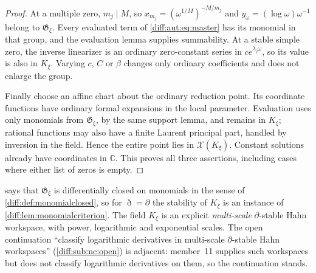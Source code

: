 \documentclass[11pt,letterpaper]{article}
\numberwithin{equation}{section}
\theoremstyle{definition}
\theoremstyle{remark}
\newcommand{\C}{\mathbb C}
\newcommand{\der}{\partial}
\newcommand{\Dn}{\eth}
\begin{document}
\begin{proof}
At a multiple zero, $m_j\mid M$, so
$x_{m_j}=(\omega^{1/M})^{-M/m_j}$ and
$y_\omega=(\log\omega)\omega^{-1}$ belong to $\mathfrak G_\xi$.
Every evaluated term of \cref{diff:aut:eq:master} has its monomial
in that group, and the evaluation lemma supplies summability.
At a stable simple zero, the inverse linearizer is an ordinary
zero-constant series in $c e^{\lambda_j\omega}$, so its value is also
in $K_\xi$. Varying $c$, $C$ or $\beta$ changes only ordinary
coefficients and does not enlarge the group.

Finally choose an affine chart about the ordinary reduction point.
Its coordinate functions have ordinary formal expansions in the local
parameter. Evaluation uses only monomials from $\mathfrak G_\xi$,
by the same support lemma, and remains in $K_\xi$; rational functions
may also have a finite Laurent principal part, handled by inversion
in the field. Hence the entire point lies in $\mathcal X(K_\xi)$.
Constant solutions already have coordinates in $\C$. This proves all
three assertions, including cases where either list of zeros is empty.
\end{proof}

\begin{remark}
\label{diff:aut:rem:monomial}
 says that $\mathfrak G_{\xi}$ is differentially
closed on monomials in the sense of \cref{diff:def:monomialclosed}, so for
$\Dn=\der$ the stability of $K_{\xi}$ is an instance of
\cref{diff:lem:monomialcriterion}. The field $K_{\xi}$ is an explicit
\emph{multi-scale} $\der$-stable Hahn workspace, with power, logarithmic and
exponential scales. The open continuation ``classify logarithmic derivatives in
multi-scale $\der$-stable Hahn workspaces'' (\cref{diff:sub:nc:open}) is adjacent:
member~11 supplies such workspaces but does not classify logarithmic derivatives
on them, so the continuation stands.
\end{remark}
\end{document}
